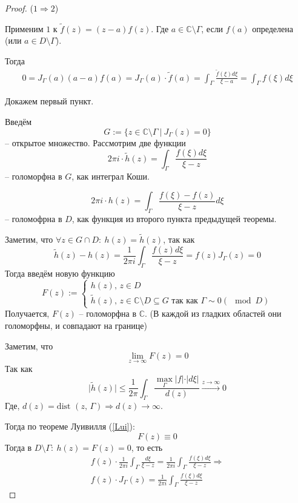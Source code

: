 \documentclass[a4paper,12pt]{article}
\renewcommand{\leq}{\ensuremath{\leqslant}}
\theoremstyle{plain}
\theoremstyle{definition}
\theoremstyle{remark}
\begin{document}
\begin{proof}
	($1 \Rightarrow 2$)

	Применим $1$ к $\tilde{f}(z) = (z - a)f(z)$. Где $a \in \mathbb{C} \setminus \Gamma$, если $f(a)$ определена (или $a \in D \setminus \Gamma$).

	Тогда
	\begin{align*}
		0 = J_\Gamma(a)(a - a)f(a) = J_\Gamma(a)\cdot\tilde{f}(a) = \int_\Gamma\frac{\tilde{f}(\xi)d\xi}{\xi - a} = \int_\Gamma f(\xi)d\xi
	\end{align*}

	Докажем первый пункт.

	Введём
	\[
		G := \{z \in \mathbb{C} \setminus \Gamma \:\vert\: J_\Gamma(z) = 0\}
	\]
	-- открытое множество. Рассмотрим две функции
	\[
		2\pi i \cdot\tilde{h}(z) = \int_\Gamma\frac{f(\xi)d\xi}{\xi - z}
	\]
	-- голоморфна в $G$, как интеграл Коши.

	\[
		2\pi i\cdot h(z) = \int_\Gamma\frac{f(\xi) - f(z)}{\xi - z}d\xi
	\]
	-- голомофрна в $D$, как функция из второго пункта предыдущей теоремы.

	Заметим, что $\forall z \in G \cap D :\: h(z) = \tilde{h}(z)$, так как
	\[
		\tilde{h}(z) - h(z) = \frac{1}{2\pi i}\int_\Gamma \frac{f(z)d\xi}{\xi - z} = f(z)J_\Gamma(z) = 0
	\]
	Тогда введём новую функцию
	\[
		F(z) := \begin{cases}
			h(z),\, z \in D \\
			\tilde{h}(z),\, z \in \mathbb{C}\setminus D \subseteq G \text{ так как } \Gamma \sim 0 (\mod D)
		\end{cases}
	\]
	Получается, $F(z)$ -- голоморфна в $\mathbb{C}$. (В каждой из гладких областей они голоморфны, и совпадают на границе)

	Заметим, что
	\[
		\lim_{z \to \infty} F(z) = 0
	\]
	Так как
	\[
		\vert\tilde{h}(z)\vert \leq \frac{1}{2\pi}\int_\Gamma\frac{\max_\Gamma \vert f\vert\cdot\vert d\xi\vert}{d(z)} \overset{z \to \infty}{\to} 0
	\]
	Где, $d(z) = \text{dist }(z,\, \Gamma) \Rightarrow d(z) \to \infty$.

	Тогда по теореме Луивилля (\ref{Lui}):
	\[
		F(z) \equiv 0
	\]
	Тогда в $D \setminus \Gamma :\: h(z) = F(z) = 0$, то есть
	\begin{align*}
		f(z)\cdot\frac{1}{2\pi i}\int_{\Gamma}\frac{d\xi}{\xi - z} = \frac{1}{2\pi i}\int_\Gamma\frac{f(\xi)d\xi}{\xi - z} \Rightarrow \\
		f(z)\cdot J_\Gamma(z) =  \frac{1}{2\pi i}\int_\Gamma\frac{f(\xi)d\xi}{\xi - z}
	\end{align*}
\end{proof}
\end{document}
